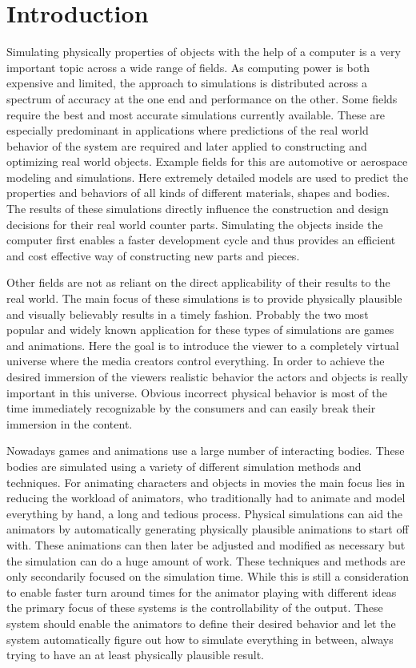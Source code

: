 \chapter{Introduction}
\label{cha:introduction}

Simulating physically properties of objects with the help of a computer is a very important topic across a wide range of fields. As computing power is both expensive and limited, the approach to simulations is distributed across a spectrum of accuracy at the one end and performance on the other. Some fields require the best and most accurate simulations currently available. These are especially predominant in applications where predictions of the real world behavior of the system are required and later applied to constructing and optimizing real world objects. Example fields for this are automotive or aerospace modeling and simulations. Here extremely detailed models are used to predict the properties and behaviors of all kinds of different materials, shapes and bodies. The results of these simulations directly influence the construction and design decisions for their real world counter parts. Simulating the objects inside the computer first enables a faster development cycle and thus provides an efficient and cost effective way of constructing new parts and pieces.

Other fields are not as reliant on the direct applicability of their results to the real world. The main focus of these simulations is to provide physically plausible and visually believably results in a timely fashion. Probably the two most popular and widely known application for these types of simulations are games and animations. Here the goal is to introduce the viewer to a completely virtual universe where the media creators control everything. In order to achieve the desired immersion of the viewers realistic behavior the actors and objects is really important in this universe. Obvious incorrect physical behavior is most of the time immediately recognizable by the consumers and can easily break their immersion in the content.

Nowadays games and animations use a large number of interacting bodies. These bodies are simulated using a variety of different simulation methods and techniques. For animating characters and objects in movies the main focus lies in reducing the workload of animators, who traditionally had to animate and model everything by hand, a long and tedious process. Physical simulations can aid the animators by automatically generating physically plausible animations to start off with. These animations can then later be adjusted and modified as necessary but the simulation can do a huge amount of work. These techniques and methods are only secondarily focused on the simulation time. While this is still a consideration to enable faster turn around times for the animator playing with different ideas the primary focus of these systems is the controllability of the output. These system should enable the animators to define their desired behavior and let the system automatically figure out how to simulate everything in between, always trying to have an at least physically plausible result.

